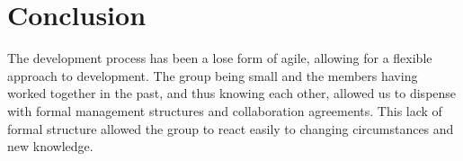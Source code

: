 \section{Conclusion}
The development process has been a lose form of agile, allowing for a flexible approach to development. The group being small and the members having worked together in the past, and thus knowing each other, allowed us to dispense with formal management structures and collaboration agreements. This lack of formal structure allowed the group to react easily to changing circumstances and new knowledge. 